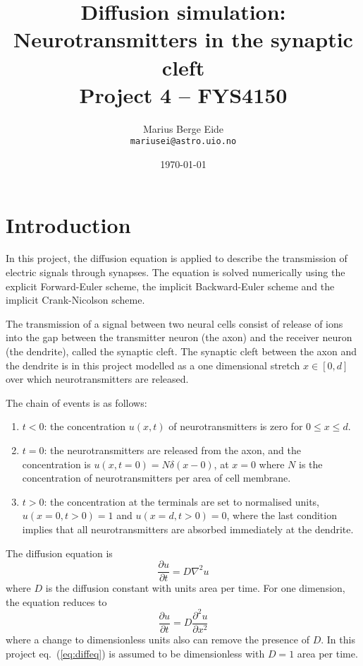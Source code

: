 \documentclass[a4paper,11pt]{article}
\date{\today}
\title{Diffusion simulation:\\ Neurotransmitters in the synaptic cleft\\ \small{Project 4 -- FYS4150}}
\author{Marius Berge Eide \\
\texttt{mariusei@astro.uio.no}}
\begin{document}
\onecolumn
\maketitle{}

\begin{abstract}
\end{abstract}

\section{Introduction}
In this project, the diffusion equation is applied to describe the transmission of electric signals through synapses. The equation is solved numerically using the explicit Forward-Euler scheme, the implicit Backward-Euler scheme and the implicit Crank-Nicolson scheme.

The transmission of a signal between two neural cells consist of release of ions into the gap between the transmitter neuron (the axon) and the receiver neuron (the dendrite), called the synaptic cleft. The synaptic cleft between the axon and the dendrite is in this project modelled as a one dimensional stretch $x \in [0,d]$ over which neurotransmitters are released.

The chain of events is as follows:
\begin{enumerate}
    \item $t<0$: the concentration $u(x,t)$ of neurotransmitters is zero for $0 \leq x \leq d$.
    \item $t=0$: the neurotransmitters are released from the axon, and the concentration is $u(x,t=0) = N \delta(x-0)$, at $x=0$ where $N$ is the concentration of neurotransmitters per area of cell membrane.
    \item $t>0$: the concentration at the terminals are set to normalised units, $u(x=0, t>0) = 1$ and $u(x=d, t>0) = 0$, where the last condition implies that all neurotransmitters are absorbed immediately at the dendrite.
\end{enumerate}

The diffusion equation is
\begin{equation}
    \frac{\partial u}{\partial t} = D \nabla^2 u
    \label{eq:diff-general}
\end{equation}
where $D$ is the diffusion constant with units area per time. For one dimension, the equation reduces to
\begin{equation}
    \frac{\partial u}{\partial t} = D \frac{\partial^2 u}{\partial x^2}
    \label{eq:diffeq}
\end{equation}
where a change to dimensionless units also can remove the presence of $D$. In this project eq.~(\ref{eq:diffeq}) is assumed to be dimensionless with $D=1$ area per time.
\end{document}
